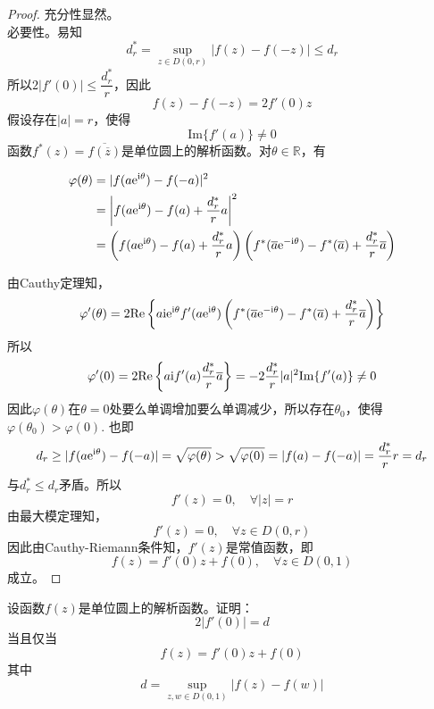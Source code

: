 \begin{proof}
    
    充分性显然。\\
    必要性。易知
    $$d_r^{*} = \sup\limits_{z \in D(0,r)}{|f(z) - f(-z)|} \leq d_r$$
    所以$2|f'(0)| \leq \dfrac{d_r^{*}}{r}$，因此
    $$f(z) - f(-z) = 2f'(0)z$$
    假设存在$|a| = r$，使得
    $$\mathrm{Im}\{f'(a)\} \neq 0$$
    函数$f^{*}(z) = \overline{f(\overline{z})}$是单位圆上的解析函数。对$\theta \in \mathbb{R}$，有

    \begin{align*}
        \varphi(\theta) & = |f(a\mathrm{e}^{\mathrm{i} \theta}) - f(-a)|^2 \\
        & = \left|f(a\mathrm{e}^{\mathrm{i} \theta}) - f(a) + \dfrac{d_r^{*}}{r}a\right|^2 \\
        & = \left(f(a\mathrm{e}^{\mathrm{i} \theta}) - f(a) + \dfrac{d_r^{*}}{r}a\right) \left(f^{*}(\overline{a}\mathrm{e}^{-\mathrm{i} \theta}) - f^{*}(\overline{a}) + \dfrac{d_r^{*}}{r}\overline{a}\right)
    \end{align*}

    由\textup{Cauthy}定理知，
    $$\varphi'(\theta) = 2 \mathrm{Re}\left\{ a\mathrm{i} \mathrm{e}^{\mathrm{i} \theta}f'(a\mathrm{e}^{\mathrm{i} \theta}) \left( f^{*}(\overline{a}\mathrm{e}^{-\mathrm{i} \theta}) - f^{*}(\overline{a}) + \dfrac{d_r^{*}}{r}\overline{a} \right) \right\}$$
    所以
    $$\varphi'(0) = 2 \mathrm{Re}\left\{a\mathrm{i} f'(a)\dfrac{d_r^{*}}{r}\overline{a}\right\} = -2\dfrac{d_r^{*}}{r}|a|^2\mathrm{Im}\{f'(a)\} \neq 0$$
    因此$\varphi(\theta)$在$\theta = 0$处要么单调增加要么单调减少，所以存在$\theta_0$，使得$\varphi(\theta_0) > \varphi(0)$. 也即
    $$d_r \geq |f(a\mathrm{e}^{\mathrm{i} \theta}) - f(-a)| = \sqrt{\varphi(\theta)} > \sqrt{\varphi(0)} = |f(a) - f(-a)| = \dfrac{d_r^{*}}{r}r = d_r$$
    与$d_r^{*} \leq d_r$矛盾。所以
    $$f'(z) = 0, \quad \forall |z| = r$$
    由最大模定理知，
    $$f'(z) = 0, \quad \forall z \in D(0,r)$$
    因此由\textup{Cauthy-Riemann}条件知，$f'(z)$是常值函数，即
    $$f(z) = f'(0)z + f(0), \quad \forall z \in D(0,1)$$
    成立。
    
\end{proof}

\begin{theorem}

    设函数$f(z)$是单位圆上的解析函数。证明：
    $$2|f'(0)| = d$$
    当且仅当
    $$f(z) = f'(0)z + f(0)$$
    其中
    $$d =\sup\limits_{z,w\in D(0,1)}{|f(z) - f(w)|}$$
    
\end{theorem}

